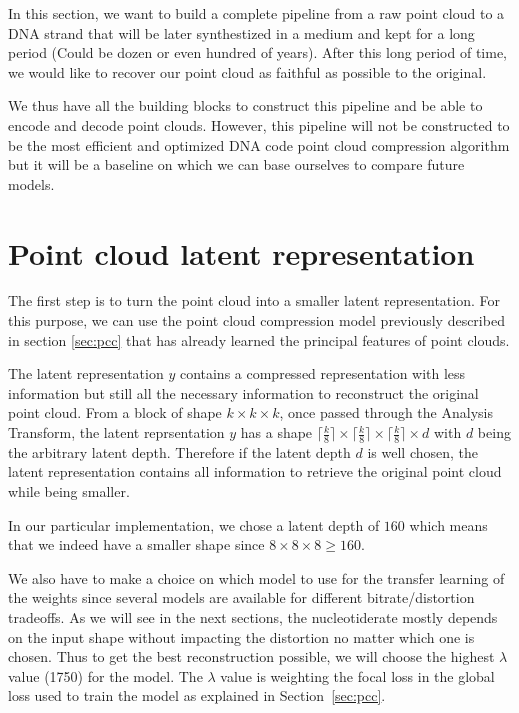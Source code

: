 

In this section, we want to build a complete pipeline from a raw point cloud to a DNA strand that will be later synthestized in a medium and kept for a long period (Could be dozen or even hundred of years). After this long period of time, we would like to recover our point cloud as faithful as possible to the original. 

We thus have all the building blocks to construct this pipeline and be able to encode and decode point clouds. However, this pipeline will not be constructed to be the most efficient and optimized DNA code point cloud compression algorithm but it will be a baseline on which we can base ourselves to compare future models. 



\section{Point cloud latent representation}

The first step is to turn the point cloud into a smaller latent representation. For this purpose, we can use the point cloud compression model previously described in section \ref{sec:pcc} that has already learned the principal features of point clouds. 

The latent representation $y$ contains a compressed representation with less information but still all the necessary information to reconstruct the original point cloud. From a block of shape $k \times k \times k$, once passed through the Analysis Transform, the latent reprsentation $y$ has a shape $\lceil\frac{k}{8}\rceil \times \lceil\frac{k}{8}\rceil \times \lceil\frac{k}{8}\rceil \times d$ with $d$ being the arbitrary latent depth. Therefore if the latent depth $d$ is well chosen, the latent representation contains all information to retrieve the original point cloud while being smaller.

In our particular implementation, we chose a latent depth of $160$ which means that we indeed have a smaller shape since $8 \times 8 \times 8 \geq 160$. 

We also have to make a choice on which model to use for the transfer learning of the weights since several models are available for different bitrate/distortion tradeoffs. As we will see in the next sections, the nucleotiderate mostly depends on the input shape without impacting the distortion no matter which one is chosen. Thus to get the best reconstruction possible, we will choose the highest $\lambda$ value (1750) for the model. The $\lambda$ value is weighting the focal loss in the global loss used to train the model as explained in Section~\ref{sec:pcc}.

